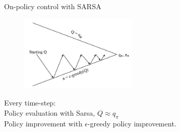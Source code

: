 \bgroup
\begin{frame}{On-policy control with SARSA}
\begin{figure}
\centering
\includegraphics[width=0.5\textwidth]{img/sarsa_control.pdf}
\end{figure}
Every \textcolor{mImagelabRed}{time-step}:\\
\textcolor{mImagelabRed}{Policy evaluation} with \textcolor{mImagelabRed}{Sarsa}, $Q\approx q_{\pi}$\\
\textcolor{mImagelabRed}{Policy improvement} with $\epsilon$-greedy policy improvement.
\end{frame}
\egroup
